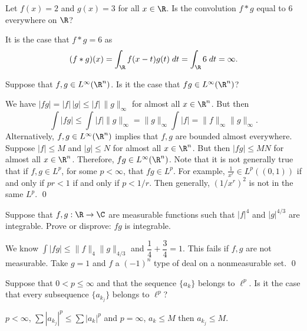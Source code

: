 \begin{quizsol}
Let $f(x)=2$ and $g(x)=3$ for all $x \in \R$. Is the convolution $f*g$ equal to 6 everywhere on $\R$?
\end{quizsol}

\pf It is the case that $f*g=6$ as
	\[
	(f*g)(x)= \int_\R f(x-t)g(t) \; dt= \int_\R 6 \; dt = \infty.
	\]


\begin{quizsol}
Suppose that $f,g \in L^\infty(\R^n)$. Is it the case that $fg \in L^\infty(\R^n)$? 
\end{quizsol}

\pf We have $|fg|=|f|\,|g| \leq |f| \, \|g\|_\infty$ for almost all $x \in \R^n$. But then
	\[
	\int |fg| \leq \int |f| \|g\|_\infty = \|g\|_\infty \int |f|= \|f\|_\infty \|g\|_\infty. 
	\]
Alternatively, $f,g \in L^\infty(\R^n)$ implies that $f,g$ are bounded almost everywhere. Suppose $|f| \leq M$ and $|g| \leq N$ for almost all $x \in \R^n$. But then $|fg| \leq MN$ for almost all $x \in \R^n$. Therefore, $fg \in L^\infty(\R^n)$. Note that it is not generally true that if $f,g \in L^p$, for some $p<\infty$, that $fg \in L^p$. For example, $\frac{1}{x^r} \in L^p((0,1))$ if and only if $pr<1$ if and only if $p<1/r$. Then generally, $(1/x^r)^2$ is not in the same $L^p$. \qed \\


%


\begin{quizsol}
Suppose that $f,g: \R \to \C$ are measurable functions such that $|f|^4$ and $|g|^{4/3}$ are integrable. Prove or disprove: $fg$ is integrable.
\end{quizsol}

\pf We know $\int |fg| \leq \|f\|_4 \|g\|_{4/3}$ and $\dfrac{1}{4} + \dfrac{3}{4} = 1$. This fails if $f,g$ are not measurable. Take $g=1$ and $f$ a $(-1)^n$ type of deal on a nonmeasurable set. \qed \\


\begin{quizsol}
Suppose that $0< p \leq \infty$ and that the sequence $\{a_k\}$ belongs to $\ell^p$. Is it the case that every subsequence $\{a_{k_j}\}$ belongs to $\ell^p$?
\end{quizsol}

\pf $p<\infty$, $\sum |a_{k_j}|^p \leq \sum |a_k|^p$ and $p=\infty$, $a_k \leq M$ then $a_{k_j} \leq M$.





















